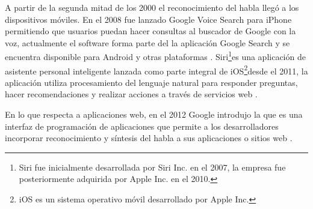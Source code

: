 A partir de la segunda mitad de los 2000 el reconocimiento del habla lleg\'{o} a los dispositivos m\'{o}viles. 
En el 2008 fue lanzado Google Voice Search para iPhone permitiendo que usuarios puedan hacer consultas al 
buscador de Google con la voz, actualmente el software forma parte del la aplicaci\'{o}n Google Search y 
se encuentra disponible para Android y otras plataformas \cite{GoogleSearch}. 
Siri\footnote{Siri fue inicialmente desarrollada por Siri Inc. en el 2007, la empresa fue posteriormente 
adquirida por Apple Inc. en el 2010.}es una aplicaci\'{o}n de asistente personal inteligente lanzada como parte
integral de iOS\footnote{iOS es un sistema operativo m\'{o}vil desarrollado por Apple Inc.}desde el 2011, 
la aplicaci\'{o}n utiliza procesamiento del lenguaje natural para responder preguntas, hacer recomendaciones y
realizar acciones a trav\'{e}s de servicios web \cite{AppleSiri}.

En lo que respecta a aplicaciones web, en el 2012 Google introdujo la  que es una interfaz de 
programaci\'{o}n de aplicaciones que permite a los desarrolladores incorporar 
reconocimiento y s\'{i}ntesis del habla a sus aplicaciones o sitios web \cite{GoogleWebSpeechAPI}.
